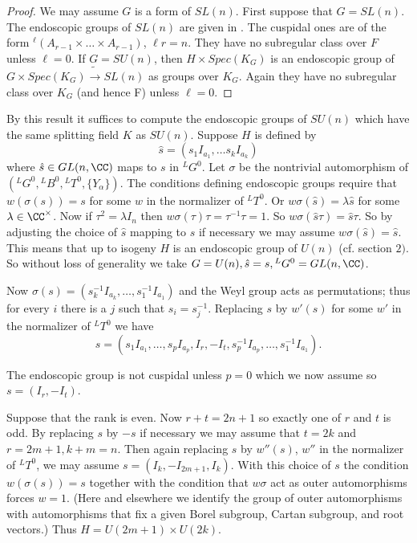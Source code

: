 \documentclass{memo-l}
\theoremstyle{definition}
\theoremstyle{remark}
\numberwithin{section}{chapter}
\numberwithin{equation}{chapter}
\begin{document}
\begin{proof}  We may assume $G$ is a form of $SL(n)$.  First suppose
that $G = SL(n)$.  The endoscopic groups of $SL(n)$ are given in \cite{MR697567}.  The
cuspidal ones are of the form
${}^{{\ell}}(A_{r-1}\times \ldots \times A_{r-1})$,
${\ell}r = n$.  They have no subregular class over $F$ unless ${\ell} = 0$.  If
$G = SU(n)$, then $H \times Spec(K_{G})$ is an endoscopic group of $G \times
Spec(K_{G}) \tilde {\to } SL(n)$ as groups over $K_{G}$.  Again they have
no subregular class over $K_{G}$ (and hence F) unless ${\ell} = 0$.
\end{proof}

{\medskip}

   By this result it suffices to compute the endoscopic groups of $SU(n)$
which have the same splitting field $K$ as $SU(n)$.  Suppose $H$ is defined
by $$\hat s  = (s_{1}I_{a_1} ,\ldots s_{k}I_{a_k} )$$ where $\hat s  \in
GL(n,\CC)$ maps to $s$ in $^{L}G^{0}$.  Let ${\sigma}$ be the nontrivial
automorphism of $({}^{L}G^{0},{}^{L}B^{0},{}^{L}T^{0},\{Y_{{\alpha}}\})$.  The
conditions defining endoscopic groups require that $w({\sigma}(s)) = s$
for some $w$ in the normalizer of $^{L}T^{0}$.  Or $w{\sigma}(\hat s)
= {\lambda}\hat s $ for some ${\lambda}  \in  {\CC}^{\times}$.  Now if
${\tau}^{2} =  {\lambda}I_{n}$ then
$w{\sigma}({\tau}){\tau} = {\tau}^{-1}{\tau} = 1$.  So $w{\sigma}(\hat s
{\tau}) = \hat s {\tau}$.  So by adjusting the choice of $\hat s $ mapping to
$s$ if necessary we may assume $w{\sigma}(\hat s ) = \hat s $.  This means
that up to isogeny $H$ is an endoscopic group of $U(n)$
(cf.  section $2)$.  So without loss of generality we take $G = U(n), \hat s
 = s, {}^{L}G^{0}  =  GL(n,\CC)$.

   Now ${\sigma}(s) = (s_{k}^{-1}I_{a_k} ,\ldots ,s_{1}^{-1}I_{a_1} )$ and
the Weyl group acts as permutations; thus for every $i$ there is a $j$ such
that $s_{i} = s_{j}^{-1}$.  Replacing $s$ by $w'(s)$ for some $w'$ in the
normalizer of $^{L}T^{0}$ we have
$$
s  =  (s_{1}I_{a_1} ,\ldots ,s_{p}I_{a_p} ,I_{r},-I_{t},s_{p}^{-1}I_{a_p}
,\ldots ,s_{1}^{-1}I_{a_1}) .
$$


The endoscopic group is not cuspidal unless $p = 0$ which we now assume so $s
 =  (I_{r},-I_{t})$.

   Suppose that the rank is even.  Now $r+t  =  2n+1$ so exactly one of $r$
and $t$ is odd.  By replacing $s$ by $-s$ if necessary we may assume that
$t = 2k$ and $r = 2m+1, k+m = n$.  Then again replacing $s$ by $w''(s)$, $w''$
in the
normalizer of ${}^{L}T^{0}$, we may assume $s = (I_{k},-I_{2m+1},I_{k})$.  With
this choice of $s$ the condition $w({\sigma}(s)) = s$ together with the
condition that $w{\sigma}$ act as outer automorphisms forces $w = 1$.  (Here
and elsewhere we identify the group of outer automorphisms with
automorphisms that fix a given Borel subgroup, Cartan subgroup, and root
vectors.) Thus $H  =  U(2m+1)\times U(2k)$.
\end{document}
